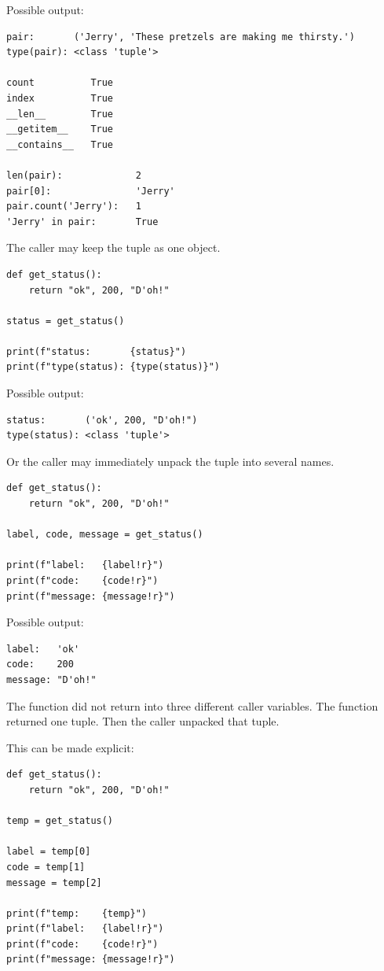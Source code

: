 Possible output:

\begin{verbatim}
pair:       ('Jerry', 'These pretzels are making me thirsty.')
type(pair): <class 'tuple'>

count          True
index          True
__len__        True
__getitem__    True
__contains__   True

len(pair):             2
pair[0]:               'Jerry'
pair.count('Jerry'):   1
'Jerry' in pair:       True
\end{verbatim}

The caller may keep the tuple as one object.

\begin{verbatim}
def get_status():
    return "ok", 200, "D'oh!"

status = get_status()

print(f"status:       {status}")
print(f"type(status): {type(status)}")
\end{verbatim}

Possible output:

\begin{verbatim}
status:       ('ok', 200, "D'oh!")
type(status): <class 'tuple'>
\end{verbatim}

Or the caller may immediately unpack the tuple into several names.

\begin{verbatim}
def get_status():
    return "ok", 200, "D'oh!"

label, code, message = get_status()

print(f"label:   {label!r}")
print(f"code:    {code!r}")
print(f"message: {message!r}")
\end{verbatim}

Possible output:

\begin{verbatim}
label:   'ok'
code:    200
message: "D'oh!"
\end{verbatim}

The function did not return into three different caller variables. The function returned one tuple. Then the caller unpacked that tuple.

This can be made explicit:

\begin{verbatim}
def get_status():
    return "ok", 200, "D'oh!"

temp = get_status()

label = temp[0]
code = temp[1]
message = temp[2]

print(f"temp:    {temp}")
print(f"label:   {label!r}")
print(f"code:    {code!r}")
print(f"message: {message!r}")
\end{verbatim}

